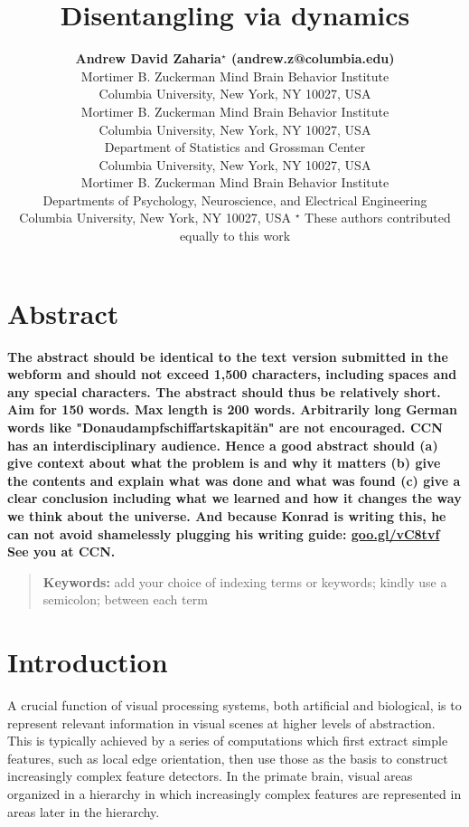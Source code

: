 \documentclass[10pt,letterpaper]{article}
\title{Disentangling via dynamics}
\author{{\large \bf Andrew David Zaharia$^\star$ (andrew.z@columbia.edu)} \\
  Mortimer B. Zuckerman Mind Brain Behavior Institute\\
  Columbia University, New York, NY 10027, USA
  \AND {\large \bf Benjamin Peters$^\star$ (bp2576@columbia.edu)} \\
  Mortimer B. Zuckerman Mind Brain Behavior Institute\\
  Columbia University, New York, NY 10027, USA
  \AND {\large \bf John Cunningham (jpc2181@columbia.edu)} \\
  Department of Statistics and Grossman Center\\
  Columbia University, New York, NY 10027, USA
  \AND {\large \bf Nikolaus Kriegeskorte (n.kriegeskorte@columbia.edu)} \\
  Mortimer B. Zuckerman Mind Brain Behavior Institute\\ Departments of Psychology, Neuroscience, and Electrical Engineering\\
  Columbia University, New York, NY 10027, USA
  \AND $^\star$ These authors contributed equally to this work}
\begin{document}
\maketitle

\section{Abstract}
{
\bf
The abstract should be identical to the text version submitted in the webform and should not exceed 1,500 characters, including spaces and any special characters. The abstract should thus be relatively short. Aim for 150 words.
Max length is 200 words. Arbitrarily long German words like "Donaudampfschiffartskapit\"an" are not encouraged.
CCN has an interdisciplinary audience. Hence a good abstract should
(a) give context about what the problem is and why it matters 
(b) give the contents and explain what was done and what was found
(c) give a clear conclusion including what we learned and how it changes 
the way we think about the universe.
And because Konrad is writing this, he can not avoid shamelessly plugging
his writing guide:
\url{goo.gl/vC8tvf} See you at CCN.
}
\begin{quote}
\small
\textbf{Keywords:} 
add your choice of indexing terms or keywords; kindly use a
semicolon; between each term
\end{quote}


\section{Introduction}

A crucial function of visual processing systems, both artificial and biological, is to represent relevant information in visual scenes at higher levels of abstraction. This is typically achieved by a series of computations which first extract simple features, such as local edge orientation, then use those as the basis to construct increasingly complex feature detectors. In the primate brain, visual areas organized in a hierarchy in which increasingly complex features are represented in areas later in the hierarchy.
\end{document}
